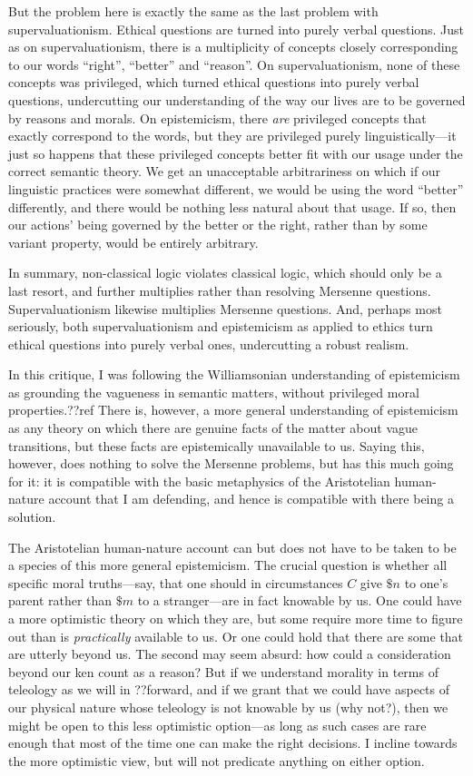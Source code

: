 But the problem here is exactly the same as the last problem with supervaluationism. Ethical questions are turned into purely verbal questions.
Just as on supervaluationism, there is a multiplicity of concepts closely corresponding to our words ``right'', ``better'' and ``reason''.
On supervaluationism, none of these concepts was privileged, which turned ethical questions into purely verbal questions, undercutting our understanding of the way  our lives are to be governed by reasons and morals. On epistemicism, there \textit{are} privileged concepts that exactly correspond to the
words, but they are privileged purely linguistically---it just so happens that these privileged concepts better fit with our usage under the
correct semantic theory. We get an unacceptable arbitrariness on which if our linguistic practices were somewhat different, we would be using the 
word ``better'' differently, and there would be nothing less natural about that usage. If so, then our actions' being governed by the better 
or the right, rather than by some variant property, would be entirely arbitrary.

In summary, non-classical logic violates classical logic, which should only be a last resort, and further multiplies rather than resolving 
Mersenne questions. Supervaluationism likewise multiplies Mersenne questions. And, perhaps most seriously, both supervaluationism and 
epistemicism as applied to ethics turn ethical questions into purely verbal ones, undercutting a robust realism.

In this critique, I was following the Williamsonian understanding of epistemicism as grounding the vagueness in semantic
matters, without privileged moral properties.??ref There is, however, a more general understanding of epistemicism as
any theory on which there are genuine facts of the matter about vague transitions, but these facts are epistemically unavailable to us. Saying this, however, does nothing to solve the Mersenne problems, but has this much going for 
it: it is compatible with the basic metaphysics of the Aristotelian human-nature account that I am defending, and 
hence is compatible with there being a solution. 

The Aristotelian human-nature account can but does not have to be taken to be a species of this more general
epistemicism. The crucial question is whether all specific moral truths---say, that one should in circumstances
$C$ give $\$ n$ to one's parent rather than $\$ m$ to a stranger---are in fact knowable by us. One could have a 
more optimistic theory on which they are, but some require more time to figure out than is \textit{practically}
available to us. Or one could hold that there are some that are utterly beyond us. The second may seem absurd:
how could a consideration beyond our ken count as a reason? But if we understand morality in terms of teleology
as we will in ??forward, and if we grant that we could have aspects of our physical nature whose teleology is
not knowable by us (why not?), then we might be open to this less optimistic option---as long as such cases are
rare enough that most of the time one can make the right decisions. I incline towards the more optimistic view,
but will not predicate anything on either option.

